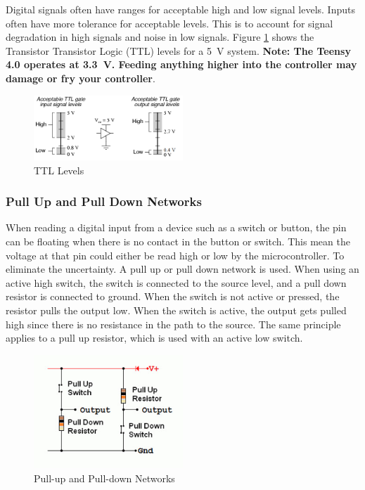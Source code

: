 \documentclass[12pt]{article}
\begin{document}
Digital signals often have ranges for acceptable high and low signal levels. Inputs often have more tolerance for acceptable levels. This is to account for signal degradation in high signals and noise in low signals. Figure \ref{fig:TTL} shows the Transistor Transistor Logic (TTL) levels for a \SI{5}{\volt} system. \textbf{Note: The Teensy 4.0 operates at \SI{3.3}{\volt}. Feeding anything higher into the controller may damage or fry your controller}.

\begin{figure}[h]
    \centering
    \includegraphics[width=0.5\textwidth]{TTL_Levels.png}
    \caption{TTL Levels}
    \label{fig:TTL}
\end{figure}

\subsubsection{Pull Up and Pull Down Networks}

When reading a digital input from a device such as a switch or button, the pin can be floating when there is no contact in the button or switch. This mean the voltage at that pin could either be read high or low by the microcontroller. To eliminate the uncertainty. A pull up or pull down network is used. When using an active high switch, the switch is connected to the source level, and a pull down resistor is connected to ground. When the switch is not active or pressed, the resistor pulls the output low. When the switch is active, the output gets pulled high since there is no resistance in the path to the source. The same principle applies to a pull up resistor, which is used with an active low switch.

\begin{figure}[h]
    \centering
    \includegraphics[width=0.5\textwidth]{pull_up_network.png}
    \caption{Pull-up and Pull-down Networks}
    \label{fig:pull up Pull down}
\end{figure}
\end{document}
